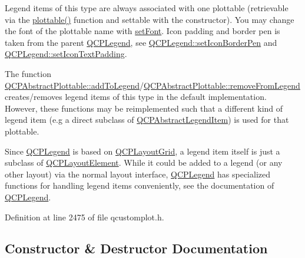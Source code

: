 Legend items of this type are always associated with one plottable (retrievable via the \hyperlink{class_q_c_p_plottable_legend_item_af29e9a2c60b4cba0cac2447b8af7b488}{plottable()} function and settable with the constructor). You may change the font of the plottable name with \hyperlink{class_q_c_p_abstract_legend_item_a409c53455d8112f71d70c0c43eb10265}{set\+Font}. Icon padding and border pen is taken from the parent \hyperlink{class_q_c_p_legend}{Q\+C\+P\+Legend}, see \hyperlink{class_q_c_p_legend_a2f2c93d18a651f4ff294bb3f026f49b8}{Q\+C\+P\+Legend\+::set\+Icon\+Border\+Pen} and \hyperlink{class_q_c_p_legend_a62973bd69d5155e8ea3141366e8968f6}{Q\+C\+P\+Legend\+::set\+Icon\+Text\+Padding}.

The function \hyperlink{class_q_c_p_abstract_plottable_a70f8cabfd808f7d5204b9f18c45c13f5}{Q\+C\+P\+Abstract\+Plottable\+::add\+To\+Legend}/\hyperlink{class_q_c_p_abstract_plottable_aa1f350e510326d012b9a9c9249736c83}{Q\+C\+P\+Abstract\+Plottable\+::remove\+From\+Legend} creates/removes legend items of this type in the default implementation. However, these functions may be reimplemented such that a different kind of legend item (e.\+g a direct subclass of \hyperlink{class_q_c_p_abstract_legend_item}{Q\+C\+P\+Abstract\+Legend\+Item}) is used for that plottable.

Since \hyperlink{class_q_c_p_legend}{Q\+C\+P\+Legend} is based on \hyperlink{class_q_c_p_layout_grid}{Q\+C\+P\+Layout\+Grid}, a legend item itself is just a subclass of \hyperlink{class_q_c_p_layout_element}{Q\+C\+P\+Layout\+Element}. While it could be added to a legend (or any other layout) via the normal layout interface, \hyperlink{class_q_c_p_legend}{Q\+C\+P\+Legend} has specialized functions for handling legend items conveniently, see the documentation of \hyperlink{class_q_c_p_legend}{Q\+C\+P\+Legend}. 

Definition at line 2475 of file qcustomplot.\+h.



\subsection{Constructor \& Destructor Documentation}
\hypertarget{class_q_c_p_plottable_legend_item_ac1072591fe409d3dabad51b23ee4d6c5}{}
